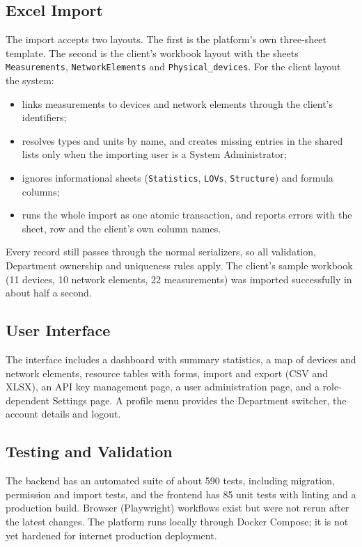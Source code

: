 \subsection{Excel Import}
The import accepts two layouts. The first is the platform's own three-sheet template. The second is the client's workbook layout with the sheets \texttt{Measurements}, \texttt{NetworkElements} and \texttt{Physical\_devices}. For the client layout the system:
\begin{itemize}
  \item links measurements to devices and network elements through the client's identifiers;
  \item resolves types and units by name, and creates missing entries in the shared lists only when the importing user is a System Administrator;
  \item ignores informational sheets (\texttt{Statistics}, \texttt{LOVs}, \texttt{Structure}) and formula columns;
  \item runs the whole import as one atomic transaction, and reports errors with the sheet, row and the client's own column names.
\end{itemize}
Every record still passes through the normal serializers, so all validation, Department ownership and uniqueness rules apply. The client's sample workbook (11 devices, 10 network elements, 22 measurements) was imported successfully in about half a second.

\subsection{User Interface}
The interface includes a dashboard with summary statistics, a map of devices and network elements, resource tables with forms, import and export (CSV and XLSX), an API key management page, a user administration page, and a role-dependent Settings page. A profile menu provides the Department switcher, the account details and logout.

\subsection{Testing and Validation}
The backend has an automated suite of about 590 tests, including migration, permission and import tests, and the frontend has 85 unit tests with linting and a production build. Browser (Playwright) workflows exist but were not rerun after the latest changes. The platform runs locally through Docker Compose; it is not yet hardened for internet production deployment.


